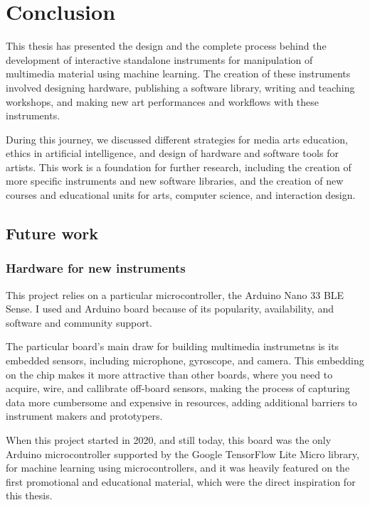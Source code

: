 \chapter{Conclusion}

This thesis has presented the design and the complete process behind the development of interactive standalone instruments for manipulation of multimedia material using machine learning. The creation of these instruments involved designing hardware, publishing a software library, writing and teaching workshops, and making new art performances and workflows with these instruments.

During this journey, we discussed different strategies for media arts education, ethics in artificial intelligence, and design of hardware and software tools for artists. This work is a foundation for further research, including the creation of more specific instruments and new software libraries, and the creation of new courses and educational units for arts, computer science, and interaction design.

\section{Future work}

\subsection{Hardware for new instruments}

This project relies on a particular microcontroller, the Arduino Nano 33 BLE Sense. I used and Arduino board because of its popularity, availability, and software and community support.

The particular board's main draw for building multimedia instrumetns is its embedded sensors, including microphone, gyroscope, and camera. This embedding on the chip makes it more attractive than other boards, where you need to acquire, wire, and callibrate off-board sensors, making the process of capturing data more cumbersome and expensive in resources, adding additional barriers to instrument makers and prototypers.

When this project started in 2020, and still today, this board was the only Arduino microcontroller supported by the Google TensorFlow Lite Micro library, for machine learning using microcontrollers, and it was heavily featured on the first promotional and educational material, which were the direct inspiration for this thesis.

